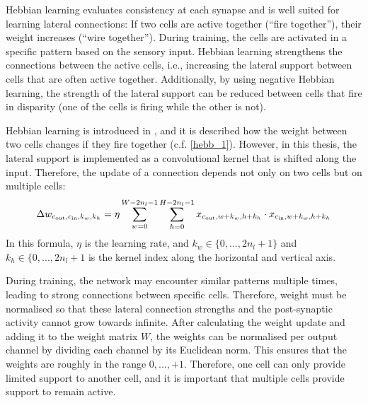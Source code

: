 Hebbian learning evaluates consistency at each synapse and is well suited for learning lateral connections: If two cells are active together (``fire together''), their weight increases (``wire together''). During training, the cells are activated in a specific pattern based on the sensory input. Hebbian learning strengthens the connections between the active cells, i.e., increasing the lateral support between cells that are often active together. Additionally, by using negative Hebbian learning, the strength of the lateral support can be reduced between cells that fire in disparity (one of the cells is firing while the other is not).

Hebbian learning is introduced in , and it is described how the weight between two cells changes if they fire together (c.f. \eqref{hebb_1}).
However, in this thesis, the lateral support is implemented as a convolutional kernel that is shifted along the input.
Therefore, the update of a connection depends not only on two cells but on multiple cells:
%
\begin{align}\eqlbl{hebbu_1}
	\Delta w_{c_{\text{out}}, c_{\text{in}},k_w,k_h} = \eta \sum_{w = 0}^{W - 2n_l - 1} \sum_{h = 0}^{H - 2n_l - 1} x_{c_{\text{out}},w+k_w,h+k_h} \cdot x_{c_{\text{in}},w+k_w,h+k_h}
\end{align}
%
In this formula, $\eta$ is the learning rate, and $k_w \in \{0, ..., 2n_l+1\}$ and $k_h\in \{0, ..., 2n_l+1$ is the kernel index along the horizontal and vertical axis.

During training, the network may encounter similar patterns multiple times, leading to strong connections between specific cells. Therefore, weight must be normalised so that these lateral connection strengths and the post-synaptic activity cannot grow towards infinite. After calculating the weight update and adding it to the weight matrix $W$, the weights can be normalised per output channel by dividing each channel by its Euclidean norm. This ensures that the weights are roughly in the range $0, ..., +1$.
Therefore, one cell can only provide limited support to another cell, and it is important that multiple cells provide support to remain active.



